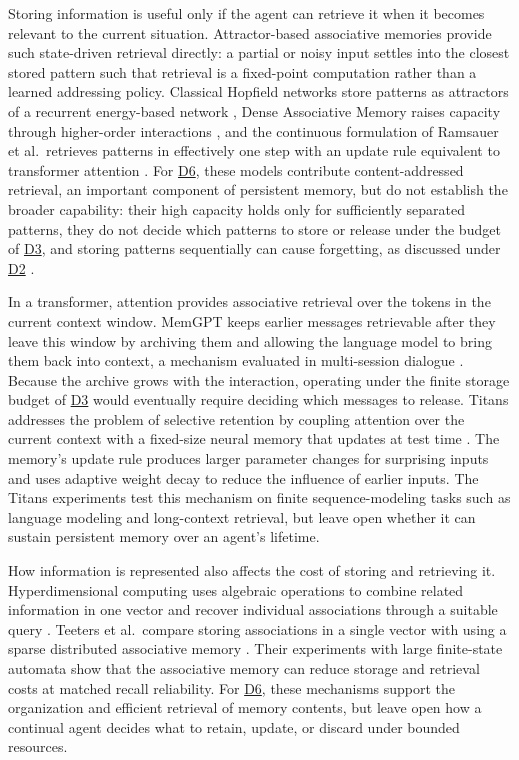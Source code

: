 \documentclass[10pt,journal,compsoc]{IEEEtran}
\DeclareRobustCommand{\Dref}[1]{\hyperref[sec:d#1]{D#1}}
\begin{document}
Storing information is useful only if the agent can retrieve it when it becomes relevant to the current situation.
Attractor-based associative memories provide such state-driven retrieval directly: a partial or noisy input settles into the closest stored pattern such that retrieval is a fixed-point computation rather than a learned addressing policy.
Classical Hopfield networks store patterns as attractors of a recurrent energy-based network \cite{hopfield1982}, Dense Associative Memory raises capacity through higher-order interactions \cite{krotov2016}, and the continuous formulation of Ramsauer et al.\ retrieves patterns in effectively one step with an update rule equivalent to transformer attention \cite{ramsauer2021,vaswani2017}.
For \Dref{6}, these models contribute content-addressed retrieval, an important component of persistent memory, but do not establish the broader capability: their high capacity holds only for sufficiently separated patterns, they do not decide which patterns to store or release under the budget of \Dref{3}, and storing patterns sequentially can cause forgetting, as discussed under \Dref{2} \cite{mcalister2025}.

In a transformer, attention provides associative retrieval over the tokens in the current context window.
MemGPT keeps earlier messages retrievable after they leave this window by archiving them and allowing the language model to bring them back into context, a mechanism evaluated in multi-session dialogue \cite{packer2023}.
Because the archive grows with the interaction, operating under the finite storage budget of \Dref{3} would eventually require deciding which messages to release.
Titans addresses the problem of selective retention by coupling attention over the current context with a fixed-size neural memory that updates at test time \cite{behrouz2025}.
The memory's update rule produces larger parameter changes for surprising inputs and uses adaptive weight decay to reduce the influence of earlier inputs.
The Titans experiments test this mechanism on finite sequence-modeling tasks such as language modeling and long-context retrieval, but leave open whether it can sustain persistent memory over an agent's lifetime.

How information is represented also affects the cost of storing and retrieving it.
Hyperdimensional computing uses algebraic operations to combine related information in one vector and recover individual associations through a suitable query \cite{kanerva2009}.
Teeters et al.\ compare storing associations in a single vector with using a sparse distributed associative memory \cite{teeters2023}.
Their experiments with large finite-state automata show that the associative memory can reduce storage and retrieval costs at matched recall reliability.
For \Dref{6}, these mechanisms support the organization and efficient retrieval of memory contents, but leave open how a continual agent decides what to retain, update, or discard under bounded resources.
\end{document}
